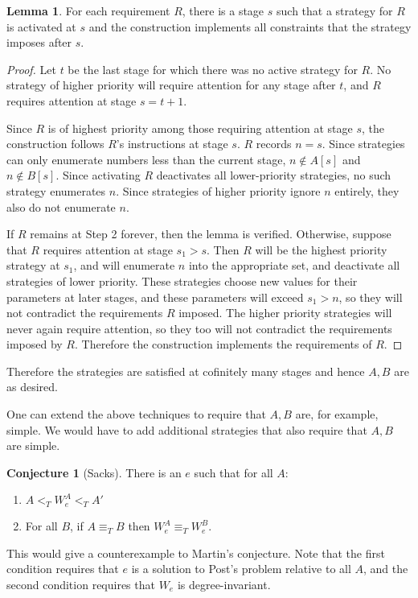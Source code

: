 \documentclass[12pt]{report}
\theoremstyle{definition}
\newtheorem{lemma}[theorem]{Lemma}
\newtheorem{conjecture}[theorem]{Conjecture}
\begin{document}
\begin{lemma}
For each requirement $R$, there is a stage $s$ such that a strategy for $R$ is activated at $s$ and the construction implements all constraints that the strategy imposes after $s$.
\end{lemma}
\begin{proof}
Let $t$ be the last stage for which there was no active strategy for $R$. No strategy of higher priority will require attention for any stage after $t$, and $R$ requires attention at stage $s = t + 1$.

Since $R$ is of highest priority among those requiring attention at stage $s$, the construction follows $R$'s instructions at stage $s$. $R$ records $n = s$.
Since strategies can only enumerate numbers less than the current stage, $n \notin A[s]$ and $n \notin B[s]$.
Since activating $R$ deactivates all lower-priority strategies, no such strategy enumerates $n$.
Since strategies of higher priority ignore $n$ entirely, they also do not enumerate $n$.

If $R$ remains at Step 2 forever, then the lemma is verified. Otherwise, suppose that $R$ requires attention at stage $s_1 > s$.
Then $R$ will be the highest priority strategy at $s_1$, and will enumerate $n$ into the appropriate set, and deactivate all strategies of lower priority.
These strategies choose new values for their parameters at later stages, and these parameters will exceed $s_1 > n$, so they will not contradict the requirements $R$ imposed.
The higher priority strategies will never again require attention, so they too will not contradict the requirements imposed by $R$.
Therefore the construction implements the requirements of $R$.
\end{proof}

Therefore the strategies are satisfied at cofinitely many stages and hence $A,B$ are as desired.

One can extend the above techniques to require that $A,B$ are, for example, simple. We would have to add additional strategies that also require that $A,B$ are simple.

\begin{conjecture}[Sacks]
There is an $e$ such that for all $A$:
\begin{enumerate}
\item $A <_T W_e^A <_T A'$
\item For all $B$, if $A \equiv_T B$ then $W_e^A \equiv_T W_e^B$.
\end{enumerate}
\end{conjecture}
This would give a counterexample to Martin's conjecture. Note that the first condition requires that $e$ is a solution to Post's problem relative to all $A$, and the second condition requires that $W_e$ is degree-invariant.
\end{document}
